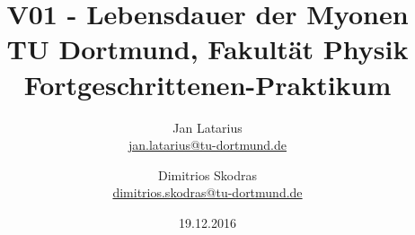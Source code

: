 

\usepackage{xfrac}


\title{V01 - Lebensdauer der Myonen\\				%
\large TU Dortmund, Fakultät Physik\\ 
\normalsize Fortgeschrittenen-Praktikum}

\author{Jan Latarius\\			%
{\small \href{jan.latarius@tu-dortmund.de}{jan.latarius@tu-dortmund.de}}	%
\and						%
Dimitrios Skodras\\					%
{\small \href{dimitrios.skodras@tu-dortmund.de}{dimitrios.skodras@tu-dortmund.de}}		%
}
\date{19.12.2016}				%





\maketitle					%
\thispagestyle{empty} 				%



\tableofcontents


\newpage					%


